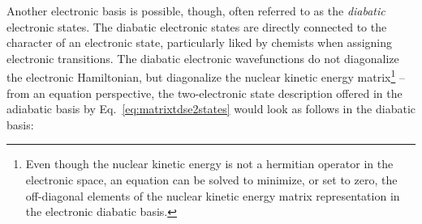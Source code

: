 \documentclass[9pt,bestpractices]{livecoms}
\begin{document}
Another electronic basis is possible, though, often referred to as the \textit{diabatic} electronic states. The diabatic electronic states are directly connected to the character of an electronic state, particularly liked by chemists when assigning electronic transitions. The diabatic electronic wavefunctions do not diagonalize the electronic Hamiltonian, but diagonalize the nuclear kinetic energy matrix\footnote{Even though the nuclear kinetic energy is not a hermitian operator in the electronic space, an equation can be solved to minimize, or set to zero, the off-diagonal elements of the nuclear kinetic energy matrix representation in the electronic diabatic basis.} -- from an equation perspective, the two-electronic state description offered in the adiabatic basis by Eq.~\eqref{eq:matrixtdse2states} would look as follows in the diabatic basis:
\end{document}
